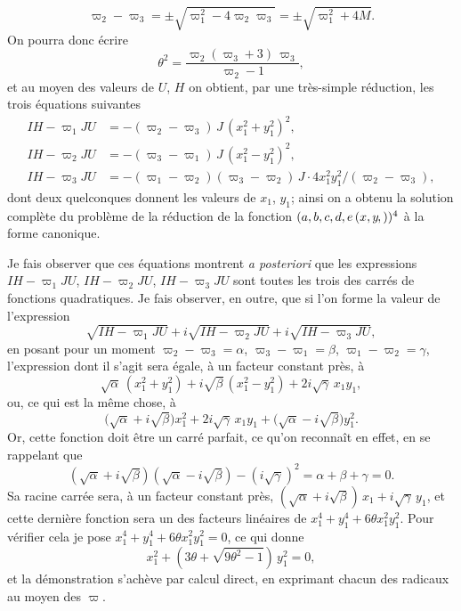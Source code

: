 \documentclass[11pt,a4paper]{article}
\newcommand{\fcn}[2]{(#1\kern-1pt, #2)}
\begin{document}
\setcounter{page}{66}

\[
\varpi_2 - \varpi_3 = \pm \sqrt{\varpi_1^2 - 4\varpi_2\varpi_3} = \pm\sqrt{\varpi_1^2 + 4 M}.
\]
On pourra donc \'ecrire
\[
\theta^2 = \frac{\varpi_2(\varpi_3 + 3)\,\varpi_3}{\varpi_2 - 1},
\]
et au moyen des valeurs de $U$, $H$ on obtient, par une tr\`es-simple r\'eduction,
les trois \'equations suivantes
\begin{align*}
IH - \varpi_1 JU &= -(\varpi_2 - \varpi_3)\,J\,(x_1^2 + y_1^2)^2,\\
IH - \varpi_2 JU &= -(\varpi_3 - \varpi_1)\,J\,(x_1^2 - y_1^2)^2,\\
IH - \varpi_3 JU &= -(\varpi_1 - \varpi_2)(\varpi_3 - \varpi_2)\,J \cdot 4 x_1^2 y_1^2 / (\varpi_2 - \varpi_3),
\end{align*}
dont deux quelconques donnent les valeurs de $x_1$, $y_1$; ainsi on a obtenu la
solution compl\`ete du probl\`eme de la r\'eduction de la fonction
$(a,b,c,d,e\,\fcn{x,y})^4$ \`a la forme canonique.

Je fais observer que ces \'equations montrent \emph{a posteriori} que les expressions
$IH-\varpi_1 JU$, $IH-\varpi_2 JU$, $IH-\varpi_3 JU$ sont toutes les trois des carr\'es
de fonctions quadratiques. Je fais observer, en outre, que si l'on forme la valeur
de l'expression
\[
\sqrt{IH - \varpi_1 JU} + i\sqrt{IH - \varpi_2 JU} + i\sqrt{IH - \varpi_3 JU},
\]
en posant pour un moment $\varpi_2 - \varpi_3 = \alpha$, $\varpi_3 - \varpi_1 = \beta$,
$\varpi_1 - \varpi_2 = \gamma$, l'expression dont il s'agit sera \'egale, \`a un
facteur constant pr\`es, \`a
\[
\sqrt{\alpha}\,(x_1^2 + y_1^2) + i\sqrt{\beta}\,(x_1^2 - y_1^2) + 2i\sqrt{\gamma}\,x_1 y_1,
\]
ou, ce qui est la m\^eme chose, \`a
\[
\big(\sqrt{\alpha} + i\sqrt{\beta}\big) x_1^2 + 2 i\sqrt{\gamma}\,x_1 y_1 + \big(\sqrt{\alpha} - i\sqrt{\beta}\big) y_1^2.
\]
Or, cette fonction doit \^etre un carr\'e parfait, ce qu'on reconna\^it en effet,
en se rappelant que
\[
(\sqrt{\alpha} + i\sqrt{\beta})(\sqrt{\alpha} - i\sqrt{\beta}) - (i\sqrt{\gamma})^2
= \alpha + \beta + \gamma = 0.
\]
Sa racine carr\'ee sera, \`a un facteur constant pr\`es,
$(\sqrt{\alpha} + i\sqrt{\beta})\,x_1 + i\sqrt{\gamma}\,y_1$, et cette derni\`ere
fonction sera un des facteurs lin\'eaires de $x_1^4 + y_1^4 + 6\theta x_1^2 y_1^2$.
Pour v\'erifier cela je pose $x_1^4 + y_1^4 + 6\theta x_1^2 y_1^2 = 0$, ce qui donne
\[
x_1^2 + (3\theta + \sqrt{9\theta^2 - 1})\,y_1^2 = 0,
\]
et la d\'emonstration s'ach\`eve par calcul direct, en exprimant chacun des
radicaux au moyen des $\varpi$.
\end{document}
